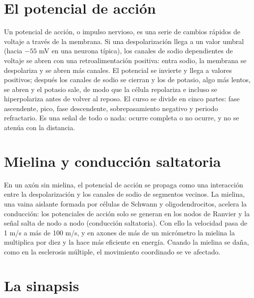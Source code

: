 \documentclass{book}
\begin{document}

\section{El potencial de acción}

Un potencial de acción, o impulso nervioso, es una serie de cambios rápidos de voltaje a través de la membrana. Si una despolarización llega a un valor umbral (hacia \(-55\) mV en una neurona típica), los canales de sodio dependientes de voltaje se abren con una retroalimentación positiva: entra sodio, la membrana se despolariza y se abren más canales. El potencial se invierte y llega a valores positivos; después los canales de sodio se cierran y los de potasio, algo más lentos, se abren y el potasio sale, de modo que la célula repolariza e incluso se hiperpolariza antes de volver al reposo. El curso se divide en cinco partes: fase ascendente, pico, fase descendente, sobrepasamiento negativo y periodo refractario. Es una señal de todo o nada: ocurre completa o no ocurre, y no se atenúa con la distancia.


\section{Mielina y conducción saltatoria}

En un axón sin mielina, el potencial de acción se propaga como una interacción entre la despolarización y los canales de sodio de segmentos vecinos. La mielina, una vaina aislante formada por células de Schwann y oligodendrocitos, acelera la conducción: los potenciales de acción solo se generan en los nodos de Ranvier y la señal salta de nodo a nodo (conducción saltatoria). Con ello la velocidad pasa de 1 m/s a más de 100 m/s, y en axones de más de un micrómetro la mielina la multiplica por diez y la hace más eficiente en energía. Cuando la mielina se daña, como en la esclerosis múltiple, el movimiento coordinado se ve afectado.


\section{La sinapsis}
\end{document}
